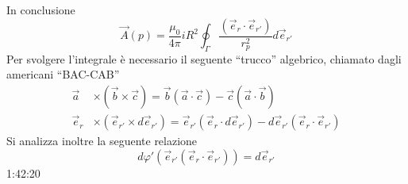 In conclusione 
$$
\vec{A}(p) = \frac{\mu_0}{4\pi}iR^2 \oint_\Gamma \frac{(\vec{e}_r\cdot\vec{e}_{r'})}{r_p^2}d\vec{e}_{r'}
$$
Per svolgere l'integrale è necessario il seguente ``trucco'' algebrico, chiamato
dagli americani ``BAC-CAB''
\begin{align*}
\vec{a} &\times\left(\vec{b}\times\vec{c}\right) = \vec{b}\left(\vec{a}\cdot\vec{c}\right) - \vec{c}\left(\vec{a}\cdot\vec{b}\right) \\
\vec{e}_r &\times \left(\vec{e}_{r'}\times d\vec{e}_{r'}\right) = \vec{e}_{r'}\left(\vec{e}_r\cdot d\vec{e}_{r'}\right) - d\vec{e}_{r'}\left(\vec{e}_r\cdot\vec{e}_{r'}\right)
\end{align*}
Si analizza inoltre la seguente relazione
$$
d\varphi'\left(\vec{e}_{r'}\left(\vec{e}_r\cdot\vec{e}_{r'}\right)\right) = d\vec{e}_{r'} 
$$
1:42:20
